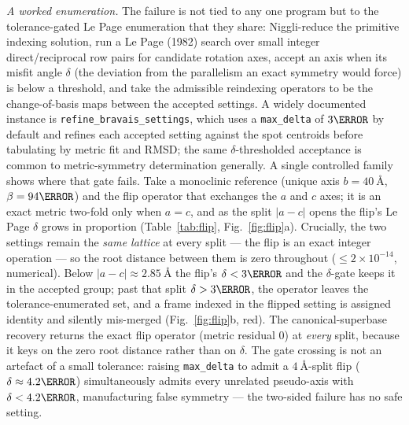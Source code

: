 \documentclass[11pt]{article}
\begin{document}
\emph{A worked enumeration.} The failure is not tied to any one program but to
the tolerance-gated Le Page enumeration that they share: Niggli-reduce the
primitive indexing solution, run a Le Page (1982) search over small integer
direct/reciprocal row pairs for candidate rotation axes, accept an axis when its
misfit angle $\delta$ (the deviation from the parallelism an exact symmetry would
force) is below a threshold, and take the admissible reindexing operators to be
the change-of-basis maps between the accepted settings. A widely documented
instance is \texttt{refine\_bravais\_settings}, which uses a \texttt{max\_delta}
of $3\degree$ by default and refines each accepted setting against the spot
centroids before tabulating by metric fit and RMSD; the same $\delta$-thresholded
acceptance is common to metric-symmetry determination generally. A single
controlled family shows where that gate fails. Take a monoclinic reference (unique axis $b = \SI{40}{\angstrom}$,
$\beta = 94\degree$) and the flip operator that exchanges the $a$ and $c$ axes;
it is an exact metric two-fold only when $a = c$, and as the split $|a-c|$ opens
the flip's Le Page $\delta$ grows in proportion (Table~\ref{tab:flip},
Fig.~\ref{fig:flip}a). Crucially, the two settings remain the \emph{same lattice}
at every split --- the flip is an exact integer operation --- so the root
distance between them is zero throughout ($\le 2\times10^{-14}$, numerical). Below
$|a-c| \approx \SI{2.85}{\angstrom}$ the flip's $\delta < 3\degree$ and the
$\delta$-gate keeps it in the accepted group; past that split
$\delta > 3\degree$, the operator leaves the tolerance-enumerated set, and a frame
indexed in the flipped setting is assigned identity and silently mis-merged
(Fig.~\ref{fig:flip}b, red). The canonical-superbase recovery returns the exact
flip operator (metric residual $0$) at \emph{every} split, because it keys on the
zero root distance rather than on $\delta$. The gate crossing is not an artefact
of a small tolerance: raising \texttt{max\_delta} to admit a
$\SI{4}{\angstrom}$-split flip ($\delta \approx 4.2\degree$) simultaneously admits
every unrelated pseudo-axis with $\delta < 4.2\degree$, manufacturing false
symmetry --- the two-sided failure has no safe setting.
\end{document}
